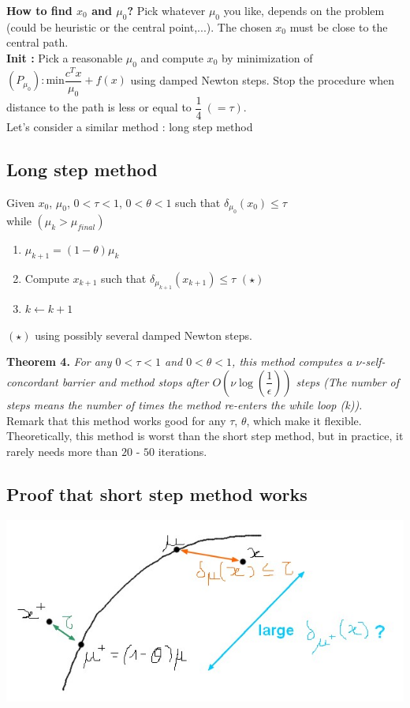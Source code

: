 \documentclass[10pt,a4paper]{article}
\begin{document}
\textbf{How to find $x_0$ and $\mu_0$?} \newline
Pick whatever $\mu_0$ you like, depends on the problem (could be heuristic or the central point,...). The chosen $x_0$ must be close to the central path.\\
\textbf{Init : }Pick a reasonable $\mu_0$ and compute $x_0$ by minimization of $(P_{\mu_0}):  \text{min} \dfrac{c^T x}{\mu_0} + f(x)$ using damped Newton steps. Stop the procedure when distance to the path is less or equal to $\dfrac{1}{4}\ (=\tau)$.\\
Let's consider a similar method : long step method

\subsection{Long step method}
Given $x_0$, $\mu_0$, $0 < \tau < 1$, $0 < \theta < 1$ such that $\delta_{\mu_0}(x_0) \leq \tau$\\
while $(\mu_k > \mu_{final})$
\begin{enumerate}
\item $\mu_{k+1} = (1 - \theta) \mu_k$ 
\item Compute $x_{k+1}$ such that $\delta_{\mu_{k+1}}(x_{k+1}) \leq \tau$ $(\star)$
\item $k \leftarrow k + 1$
\end{enumerate}
$(\star)$ using possibly several damped Newton steps. 


\textbf{Theorem 4.}
\textit{For any $0 < \tau < 1$ and $0 < \theta < 1$, this method computes a $\nu$-self-concordant barrier and method stops after $O(\nu \log(\dfrac{1}{\epsilon}))$ steps (The number of steps means the number of times the method re-enters the while loop (k)).}\\

Remark that this method works good for any $\tau$, $\theta$, which make it flexible. Theoretically, this method is worst than the short step method, but in practice, it rarely needs more than $20$ - $50$ iterations. 

\subsection{Proof that short step method works}

\begin{center}
\includegraphics[scale=0.5]{fig3.jpg} 
\end{center}
\end{document}
